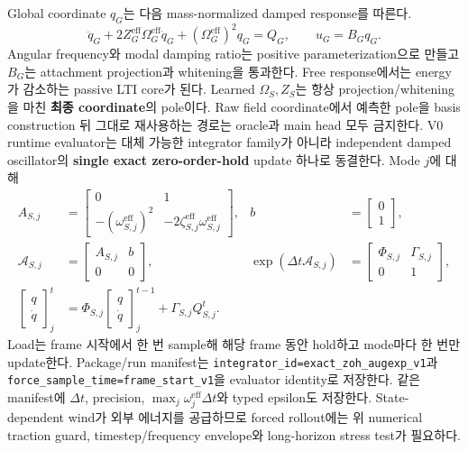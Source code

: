 \documentclass[11pt]{article}
\newcommand{\code}[1]{{\small\nolinkurl{#1}}}
\begin{document}
Global coordinate \(q_G\)는 다음 mass-normalized damped response를 따른다.
\begin{equation}
  \ddot q_G+2Z_G^{\mathrm{eff}}\Omega_G^{\mathrm{eff}}\dot q_G+
  (\Omega_G^{\mathrm{eff}})^2q_G=Q_G,
  \qquad u_G=B_Gq_G.
  \label{eq:rd-global-response}
\end{equation}
Angular frequency와 modal damping ratio는 positive parameterization으로 만들고 \(B_G\)는
attachment projection과 whitening을 통과한다. Free response에서는 energy가 감소하는 passive LTI core가 된다.
Learned \(\Omega_S,Z_S\)는 항상 projection/whitening을 마친 \textbf{최종 coordinate}의 pole이다.
Raw field coordinate에서 예측한 pole을 basis construction 뒤 그대로 재사용하는 경로는
oracle과 main head 모두 금지한다.
V0 runtime evaluator는 대체 가능한 integrator family가 아니라 independent damped oscillator의
\textbf{single exact zero-order-hold} update 하나로 동결한다. Mode \(j\)에 대해
\begin{equation}
  \begin{aligned}
  A_{S,j}&=
  \begin{bmatrix}
    0&1\\
    -(\omega_{S,j}^{\mathrm{eff}})^2&
    -2\zeta_{S,j}^{\mathrm{eff}}\omega_{S,j}^{\mathrm{eff}}
  \end{bmatrix},
  &b&=\begin{bmatrix}0\\1\end{bmatrix},\\
  \mathcal A_{S,j}&=\begin{bmatrix}A_{S,j}&b\\0&0\end{bmatrix},
  &\exp(\Delta t\mathcal A_{S,j})
    &=\begin{bmatrix}\Phi_{S,j}&\Gamma_{S,j}\\0&1\end{bmatrix},\\
  \begin{bmatrix}q\\\dot q\end{bmatrix}_{j}^{t}
    &=\Phi_{S,j}\begin{bmatrix}q\\\dot q\end{bmatrix}_{j}^{t-1}
      +\Gamma_{S,j}Q_{S,j}^{t}.&&
  \end{aligned}
  \label{eq:rd-exact-zoh}
\end{equation}
Load는 frame 시작에서 한 번 sample해 해당 frame 동안 hold하고 mode마다 한 번만 update한다.
Package/run manifest는 \code{integrator_id=exact_zoh_augexp_v1}과
\code{force_sample_time=frame_start_v1}을 evaluator identity로 저장한다.
같은 manifest에 \(\Delta t\), precision, \(\max_j\omega_j^{\mathrm{eff}}\Delta t\)와
typed epsilon도 저장한다.
State-dependent wind가 외부 에너지를 공급하므로 forced rollout에는 위 numerical traction guard,
timestep/frequency envelope와
long-horizon stress test가 필요하다.
\end{document}
